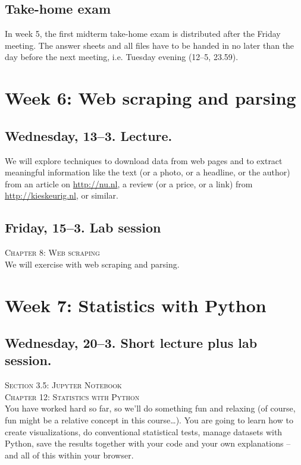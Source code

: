 \documentclass[a4paper,10pt]{report}
\begin{document}
\subsection*{Take-home exam}
In week 5, the first midterm take-home exam is distributed after the Friday meeting. The answer sheets and all files have to be handed in no later than the day before the next meeting, i.e. Tuesday evening (12--5, 23.59).




\section*{Week 6: Web scraping and parsing}

\subsection*{Wednesday, 13--3. Lecture.}
We will explore techniques to download data from web pages and to extract meaningful information like the text (or a photo, or a headline, or the author) from an article on \url{http://nu.nl}, a review (or a price, or a link) from \url{http://kieskeurig.nl}, or similar. 

\subsection*{Friday, 15--3. Lab session}
\textsc{ Chapter 8: Web scraping}\\
We will exercise with web scraping and parsing.





\section*{Week 7: Statistics with Python}

\subsection*{Wednesday, 20--3. Short lecture plus lab session.}
\textsc{ Section 3.5: Jupyter Notebook}\\
\textsc{ Chapter 12: Statistics with Python}\\
You have worked hard so far, so we'll do something fun and relaxing (of course, fun might be a relative concept in this course\ldots). You are going to learn how to create visualizations, do conventional statistical tests, manage datasets with Python, save the results together with your code and your own explanations -- and all of this within your browser.
\end{document}
